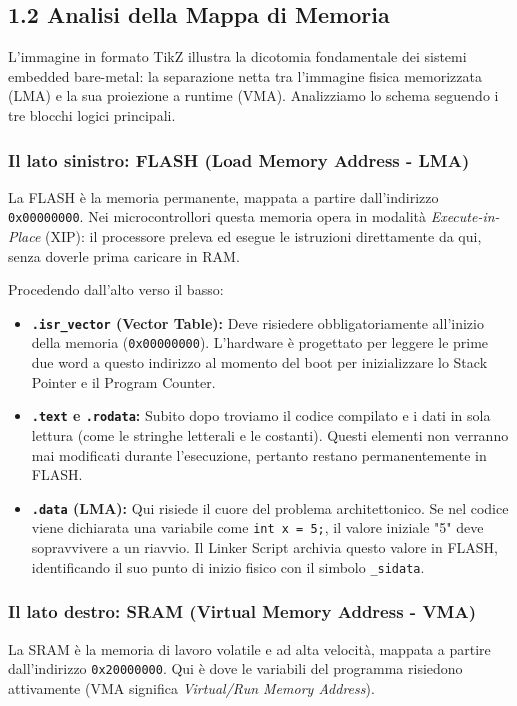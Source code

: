 \subsection*{1.2 Analisi della Mappa di Memoria}
L'immagine in formato TikZ illustra la dicotomia fondamentale dei sistemi embedded bare-metal: la separazione netta tra l'immagine fisica memorizzata (LMA) e la sua proiezione a runtime (VMA). Analizziamo lo schema seguendo i tre blocchi logici principali.

\subsubsection*{Il lato sinistro: FLASH (Load Memory Address - LMA)}
La FLASH è la memoria permanente, mappata a partire dall'indirizzo \texttt{0x00000000}. Nei microcontrollori questa memoria opera in modalità \textit{Execute-in-Place} (XIP): il processore preleva ed esegue le istruzioni direttamente da qui, senza doverle prima caricare in RAM.

Procedendo dall'alto verso il basso:
\begin{itemize}
    \item \textbf{\texttt{.isr\_vector} (Vector Table):} Deve risiedere obbligatoriamente all'inizio della memoria (\texttt{0x00000000}). L'hardware è progettato per leggere le prime due word a questo indirizzo al momento del boot per inizializzare lo Stack Pointer e il Program Counter.
    \item \textbf{\texttt{.text} e \texttt{.rodata}:} Subito dopo troviamo il codice compilato e i dati in sola lettura (come le stringhe letterali e le costanti). Questi elementi non verranno mai modificati durante l'esecuzione, pertanto restano permanentemente in FLASH.
    \item \textbf{\texttt{.data} (LMA):} Qui risiede il cuore del problema architettonico. Se nel codice viene dichiarata una variabile come \texttt{int x = 5;}, il valore iniziale "5" deve sopravvivere a un riavvio. Il Linker Script archivia questo valore in FLASH, identificando il suo punto di inizio fisico con il simbolo \texttt{\_sidata}.
\end{itemize}

\subsubsection*{Il lato destro: SRAM (Virtual Memory Address - VMA)}
La SRAM è la memoria di lavoro volatile e ad alta velocità, mappata a partire dall'indirizzo \texttt{0x20000000}. Qui è dove le variabili del programma risiedono attivamente (VMA significa \textit{Virtual/Run Memory Address}).

